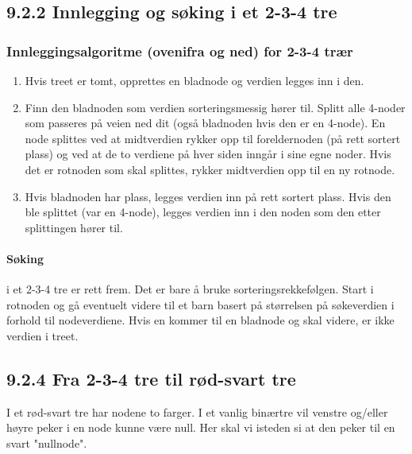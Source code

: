 \documentclass[11pt]{article}
\begin{document}
    \subsection{9.2.2 Innlegging og søking i et 2-3-4 tre}
        \subsubsection{Innleggingsalgoritme (ovenifra og ned) for 2-3-4 trær}
            \begin{enumerate}
                \item Hvis treet er tomt, opprettes en bladnode og verdien legges inn i den.
                \item Finn den bladnoden som verdien sorteringsmessig hører til. Splitt alle 4-noder som
                    passeres på veien ned dit (også bladnoden hvis den er en 4-node). En node splittes ved
                    at midtverdien rykker opp til foreldernoden (på rett sortert plass) og ved at de to
                    verdiene på hver siden inngår i sine egne noder. Hvis det er rotnoden som skal splittes,
                    rykker midtverdien opp til en ny rotnode.
                \item Hvis bladnoden har plass, legges verdien inn på rett sortert plass. Hvis den ble splittet
                    (var en 4-node), legges verdien inn i den noden som den etter splittingen hører til.
            \end{enumerate}

            \paragraph{Søking} i et 2-3-4 tre er rett frem. Det er bare å bruke sorteringsrekkefølgen. Start i rotnoden
            og gå eventuelt videre til et barn basert på størrelsen på søkeverdien i forhold til
            nodeverdiene. Hvis en kommer til en bladnode og skal videre, er ikke verdien i treet.



    \subsection{9.2.4 Fra 2-3-4 tre til rød-svart tre}
        I et rød-svart tre har nodene to farger. I et vanlig binærtre vil venstre og/eller høyre peker i
        en node kunne være null. Her skal vi isteden si at den peker til en svart "nullnode".
\end{document}
